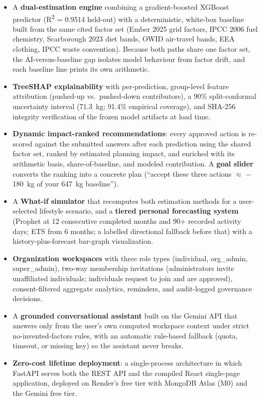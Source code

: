 \documentclass[conference]{IEEEtran}
\begin{document}
\begin{itemize}
    \item A \textbf{dual-estimation engine} combining a gradient-boosted XGBoost predictor (R\textsuperscript{2} = 0.9514 held-out) with a deterministic, white-box baseline built from the same cited factor set (Ember 2025 grid factors, IPCC 2006 fuel chemistry, Scarborough 2023 diet bands, OWID air-travel bands, EEA clothing, IPCC waste convention). Because both paths share one factor set, the AI-versus-baseline gap isolates model behaviour from factor drift, and each baseline line prints its own arithmetic.
    \item \textbf{TreeSHAP explainability} with per-prediction, group-level feature attribution (pushed-up vs.\ pushed-down contributors), a 90\% split-conformal uncertainty interval (71.3~kg; 91.4\% empirical coverage), and SHA-256 integrity verification of the frozen model artifacts at load time.
    \item \textbf{Dynamic impact-ranked recommendations}: every approved action is re-scored against the submitted answers after each prediction using the shared factor set, ranked by estimated planning impact, and enriched with its arithmetic basis, share-of-baseline, and modeled contribution. A \textbf{goal slider} converts the ranking into a concrete plan (``accept these three actions $\approx$ $-$180~kg of your 647~kg baseline'').
    \item A \textbf{What-if simulator} that recomputes both estimation methods for a user-selected lifestyle scenario, and a \textbf{tiered personal forecasting system} (Prophet at 12 consecutive completed months and 90+ recorded activity days; ETS from 6 months; a labelled directional fallback before that) with a history-plus-forecast bar-graph visualization.
    \item \textbf{Organization workspaces} with three role types (individual, org\_admin, super\_admin), two-way membership invitations (administrators invite unaffiliated individuals; individuals request to join and are approved), consent-filtered aggregate analytics, reminders, and audit-logged governance decisions.
    \item A \textbf{grounded conversational assistant} built on the Gemini API that answers only from the user's own computed workspace context under strict no-invented-factors rules, with an automatic rule-based fallback (quota, timeout, or missing key) so the assistant never breaks.
    \item \textbf{Zero-cost lifetime deployment}: a single-process architecture in which FastAPI serves both the REST API and the compiled React single-page application, deployed on Render's free tier with MongoDB Atlas (M0) and the Gemini free tier.
\end{itemize}
\end{document}
